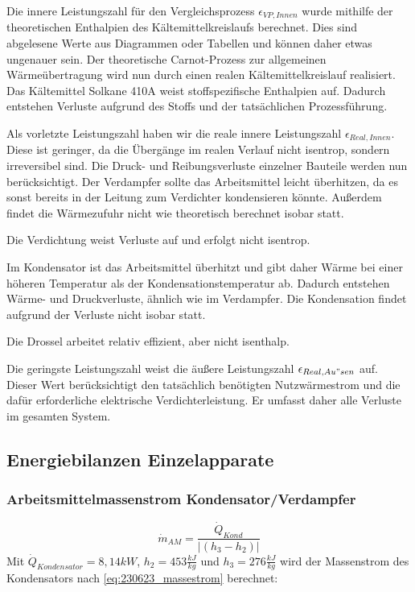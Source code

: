 Die innere Leistungszahl für den Vergleichsprozess $\epsilon_{VP,Innen}$ wurde mithilfe der theoretischen Enthalpien des Kältemittelkreislaufs berechnet.
Dies sind abgelesene Werte aus Diagrammen oder Tabellen und können daher etwas ungenauer sein. 
Der theoretische Carnot-Prozess zur allgemeinen Wärmeübertragung wird nun durch einen realen Kältemittelkreislauf realisiert. 
Das Kältemittel Solkane 410A weist stoffspezifische Enthalpien auf. 
Dadurch entstehen Verluste aufgrund des Stoffs und der tatsächlichen Prozessführung.

Als vorletzte Leistungszahl haben wir die reale innere Leistungszahl $\epsilon_{Real,Innen}$.
Diese ist geringer, da die Übergänge im realen Verlauf nicht isentrop, sondern irreversibel sind. 
Die Druck- und Reibungsverluste einzelner Bauteile werden nun berücksichtigt. 
Der Verdampfer sollte das Arbeitsmittel leicht überhitzen, da es sonst bereits in der Leitung zum Verdichter kondensieren könnte. 
Außerdem findet die Wärmezufuhr nicht wie theoretisch berechnet isobar statt.

Die Verdichtung weist Verluste auf und erfolgt nicht isentrop.

Im Kondensator ist das Arbeitsmittel überhitzt und gibt daher Wärme bei einer höheren Temperatur als der Kondensationstemperatur ab. 
Dadurch entstehen Wärme- und Druckverluste, ähnlich wie im Verdampfer. 
Die Kondensation findet aufgrund der Verluste nicht isobar statt.

Die Drossel arbeitet relativ effizient, aber nicht isenthalp.

Die geringste Leistungszahl weist die äußere Leistungszahl $\epsilon_{Real,Au"sen}$ auf. 
Dieser Wert berücksichtigt den tatsächlich benötigten Nutzwärmestrom und die dafür erforderliche elektrische Verdichterleistung. 
Er umfasst daher alle Verluste im gesamten System.


\subsection{Energiebilanzen Einzelapparate}
\label{subsec:Massenstrom}
\subsubsection{Arbeitsmittelmassenstrom Kondensator/Verdampfer}
\begin{equation}
   \dot m_{AM} = \frac{\dot Q_{Kond}}{|(h_3 - h_2)|}
   \label{eq:230623_massestrom}
\end{equation}
Mit $\dot Q_{Kondensator}=8,14kW$, $h_2=453\frac{kJ}{kg}$ und $h_3=276\frac{kJ}{kg}$ wird der Massenstrom des Kondensators nach \autoref*{eq:230623_massestrom} berechnet:

